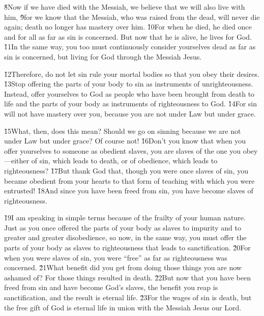 \v{8}Now if we have died with the Messiah, we believe that we will also live with him, \v{9}for we know that the Messiah, who was raised from the dead, will never die again; death no longer has mastery over him. \v{10}For when he died, he died once and for all as far as sin is concerned. But now that he is alive, he lives for God. \v{11}In the same way, you too must continuously consider yourselves dead as far as sin is concerned, but living for God through the Messiah Jesus.

\v{12}Therefore, do not let sin rule your mortal bodies so that you obey their desires. \v{13}Stop offering the parts of your body to sin as instruments of unrighteousness. Instead, offer yourselves to God as people who have been brought from death to life and the parts of your body as instruments of righteousness to God. \v{14}For sin will not have mastery over you, because you are not under Law but under grace.

\v{15}What, then, does this mean? Should we go on sinning because we are not under Law but under grace? Of course not! \v{16}Don't you know that when you offer yourselves to someone as obedient slaves, you are slaves of the one you obey---either of sin, which leads to death, or of obedience, which leads to righteousness? \v{17}But thank God that, though you were once slaves of sin, you became obedient from your hearts to that form of teaching with which you were entrusted! \v{18}And since you have been freed from sin, you have become slaves of righteousness.

\v{19}I am speaking in simple terms because of the frailty of your human nature. Just as you once offered the parts of your body as slaves to impurity and to greater and greater disobedience, so now, in the same way, you must offer the parts of your body as slaves to righteousness that leads to sanctification. \v{20}For when you were slaves of sin, you were ``free'' as far as righteousness was concerned. \v{21}What benefit did you get from doing those things you are now ashamed of? For those things resulted in death. \v{22}But now that you have been freed from sin and have become God's slaves, the benefit you reap is sanctification, and the result is eternal life. \v{23}For the wages of sin is death, but the free gift of God is eternal life in union with the Messiah Jesus our Lord.


